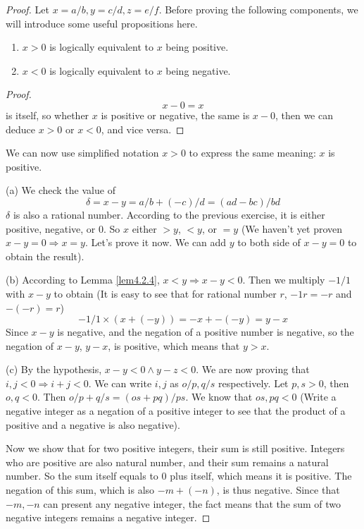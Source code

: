 \begin{proof}
Let $x=a/b,y=c/d,z=e/f$. Before proving the following components, we will introduce some useful 
propositions here.
\begin{lem} \label{lem4.2.4}
\begin{enumerate}
\item $x>0$ is logically equivalent to $x$ being positive.
\item $x<0$ is logically equivalent to $x$ being negative.
\end{enumerate}
\end{lem}
\begin{proof}
\[
x-0 =x
\]
is itself, so whether $x$ is positive or negative, the same is $x-0$, then we can deduce $x>0$ or $x<0$, 
and vice versa.
\end{proof}

We can now use simplified notation $x>0$ to express the same meaning: $x$ is positive. 

(a)
We check the value of 
\[
\delta = x-y = a/b +(-c)/d = (ad-bc)/bd
\]
$\delta$ is also a rational number. According to the previous exercise, it is either positive, negative, 
or $0$. So $x$ either $>y$, $<y$, or $=y$ (We haven't yet proven $x-y=0 \Longrightarrow x = y$. Let's 
prove it now. We can add $y$ to both side of $x-y=0$ to obtain the result).

(b)
According to Lemma \ref{lem4.2.4}, $x<y \Longrightarrow x-y<0$. Then we multiply $-1/1$ with $x-y$ to 
obtain (It is easy to see that for rational number $r$, $-1r = -r$ and $-(-r)=r$)
\[
-1/1 \times (x + (-y)) = -x + -(-y) = y - x
\]
Since $x-y$ is negative, and the negation of a positive number is negative, so the negation of $x-y$, 
$y-x$, is positive, which means that $y>x$.

(c)
By the hypothesis, $x-y<0 \wedge y-z<0$. We are now proving that $i,j<0 \Longrightarrow i + j <0$. We can 
write $i,j$ as $o/p,q/s$ respectively. Let $p,s>0$, then $o,q<0$. Then $o/p+q/s = (os+pq)/ps$. We know 
that $os,pq<0$ (Write a negative integer as a negation of a positive integer to see that the product of a 
positive and a negative is also negative). 

Now we show that for two positive integers, their sum is still 
positive. Integers who are positive are also natural number, and their sum remains a natural number. So 
the sum itself equals to $0$ plus itself, which means it is positive. The negation of this sum, which is 
also $-m+(-n)$, is thus negative. Since that $-m,-n$ can present any negative integer, the fact means that 
the sum of two negative integers remains a negative integer.


\end{proof}
